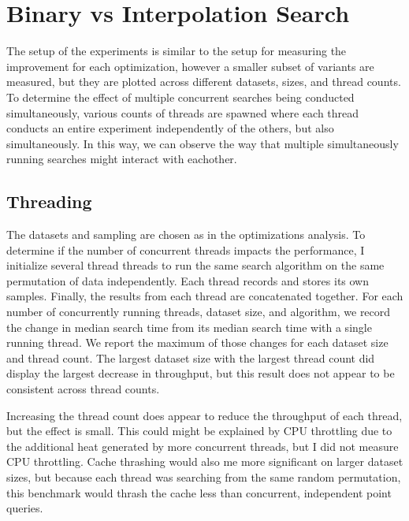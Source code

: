 \documentclass[twocolumn]{article}
\begin{document}
\section{Binary vs Interpolation Search}
The setup of the experiments is similar to the setup for measuring the improvement for each optimization, however a smaller subset of variants are measured, but they are plotted across different datasets, sizes, and thread counts. To determine the effect of multiple concurrent searches being conducted simultaneously, various counts of threads are spawned where each thread conducts an entire experiment independently of the others, but also simultaneously. In this way, we can observe the way that multiple simultaneously running searches might interact with eachother.

\subsection{Threading}
The datasets and sampling are chosen as in the optimizations analysis. To determine if the number of concurrent threads impacts the performance, I initialize several thread threads to run the same search algorithm on the same permutation of data independently. Each thread records and stores its own samples. Finally, the results from each thread are concatenated together. For each number of concurrently running threads, dataset size, and algorithm, we record the change in median search time from its median search time with a single running thread. We report the maximum of those changes for each dataset size and thread count. The largest dataset size with the largest thread count did display the largest decrease in throughput, but this result does not appear to be consistent across thread counts. 

Increasing the thread count does appear to reduce the throughput of each thread, but the effect is small. This could might be explained by CPU throttling due to the additional heat generated by more concurrent threads, but I did not measure CPU throttling. Cache thrashing would also me more significant on larger dataset sizes, but because each thread was searching from the same random permutation, this benchmark would thrash the cache less than concurrent, independent point queries.
\end{document}
